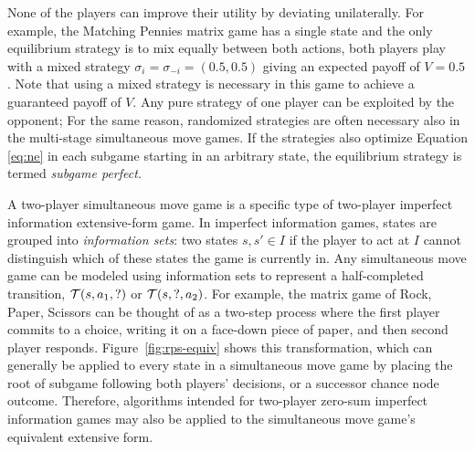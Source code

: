 None of the players can improve their utility by deviating unilaterally. 
For example, the Matching Pennies matrix game has a single state and the only equilibrium strategy is to mix equally between 
both actions, \ie both players play with a mixed strategy $\sigma_i = \sigma_{-i} = (0.5, 0.5)$ giving an expected payoff of 
$V = 0.5$. 
Note that using a mixed strategy is necessary in this game to achieve a guaranteed payoff of $V$.
Any pure strategy of one player can be exploited by the opponent; 
For the same reason, randomized strategies are often necessary also in the multi-stage simultaneous move games. 
If the strategies also optimize Equation \ref{eq:ne} in each subgame starting in an arbitrary state, the equilibrium strategy 
is termed {\it subgame perfect.}


A two-player simultaneous move game is a specific type of two-player imperfect information extensive-form game. 
In imperfect information
games, states are grouped into {\it information sets}: two states $s, s' \in I$ if the player 
to act at $I$ cannot distinguish which of these states the game is currently in. Any simultaneous move game can be modeled 
using information sets to represent a half-completed transition, \ie $\mathcal{T}(s, a_1, ?)$ or $\mathcal{T}(s, ?, a_2)$. 
For example, the matrix game of Rock, Paper, Scissors can be thought of as a two-step process where the first player commits
to a choice, writing it on a face-down piece of paper, and then second player responds. Figure~\ref{fig:rps-equiv} shows this
transformation, which can generally be applied to every state in a simultaneous move game by placing the root of subgame following 
both players' decisions, or a successor chance node outcome. 
Therefore, algorithms intended for two-player zero-sum imperfect information games may also be applied to the 
simultaneous move game's equivalent extensive form. 

